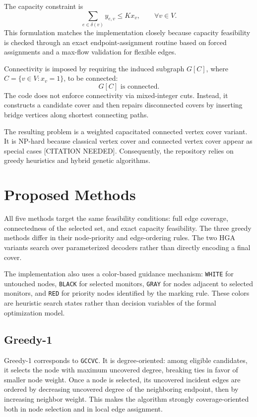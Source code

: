 \documentclass[11pt]{article}
\begin{document}
The capacity constraint is
\[
\sum_{e\in \delta(v)} y_{e,v}\le Kx_v,\qquad \forall v\in V.
\]
This formulation matches the implementation closely because capacity feasibility is checked through an exact endpoint-assignment routine based on forced assignments and a max-flow validation for flexible edges.

Connectivity is imposed by requiring the induced subgraph \(G[C]\), where \(C=\{v\in V:x_v=1\}\), to be connected:
\[
G[C]\text{ is connected.}
\]
The code does not enforce connectivity via mixed-integer cuts. Instead, it constructs a candidate cover and then repairs disconnected covers by inserting bridge vertices along shortest connecting paths.

The resulting problem is a weighted capacitated connected vertex cover variant. It is NP-hard because classical vertex cover and connected vertex cover appear as special cases [CITATION NEEDED]. Consequently, the repository relies on greedy heuristics and hybrid genetic algorithms.

\section{Proposed Methods}

All five methods target the same feasibility conditions: full edge coverage, connectedness of the selected set, and exact capacity feasibility. The three greedy methods differ in their node-priority and edge-ordering rules. The two HGA variants search over parameterized decoders rather than directly encoding a final cover.

The implementation also uses a color-based guidance mechanism: \texttt{WHITE} for untouched nodes, \texttt{BLACK} for selected monitors, \texttt{GRAY} for nodes adjacent to selected monitors, and \texttt{RED} for priority nodes identified by the marking rule. These colors are heuristic search states rather than decision variables of the formal optimization model.

\subsection{Greedy-1}

Greedy-1 corresponds to \texttt{GCCVC}. It is degree-oriented: among eligible candidates, it selects the node with maximum uncovered degree, breaking ties in favor of smaller node weight. Once a node is selected, its uncovered incident edges are ordered by decreasing uncovered degree of the neighboring endpoint, then by increasing neighbor weight. This makes the algorithm strongly coverage-oriented both in node selection and in local edge assignment.
\end{document}
